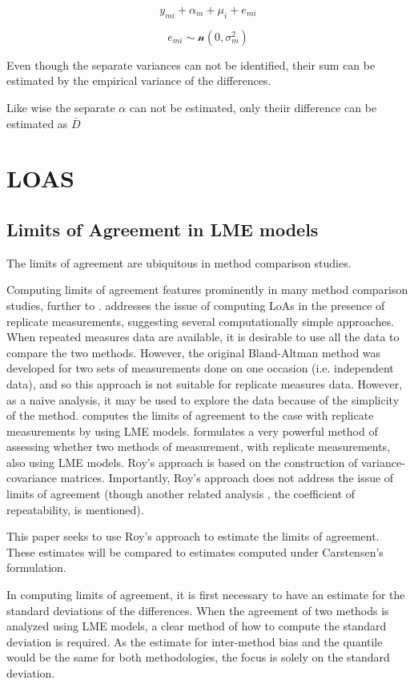 \documentclass[12pt, a4paper]{report}
\theoremstyle{plain}
\theoremstyle{definition}
\theoremstyle{remark}
\begin{document}
\[y_{mi} + \alpha_{m} + \mu_{i} + e_{mi}\]

\[e_{mi} \sim \mathcal{n} (0,\sigma^2_m)\]

Even though the separate variances can not be
identified, their sum can be estimated by the empirical variance of the differences.

Like wise the separate $\alpha$ can not be
estimated, only theiir difference can be estimated as
$\bar{D}$


\chapter{LOAS}
\section{Limits of Agreement in LME models}
The limits of agreement \citep{BA86} are ubiquitous in method comparison studies. 

Computing limits of agreement features prominently in many method comparison studies, further to \citet{BA86,BA99}.
\citet{BA99} addresses the issue of computing LoAs in the presence of replicate measurements, suggesting several computationally simple approaches. When repeated measures data are available, it is desirable to use
all the data to compare the two methods. However, the original Bland-Altman method was developed for two sets of measurements done on one occasion (i.e. independent data), and so this approach is not suitable for replicate measures data. However, as a naive analysis, it may be used to explore the data because of the simplicity of the method.
\citet{BXC2008}  computes the limits of agreement to the case with replicate measurements by using LME models.
\bigskip
\citet{ARoy2009} formulates a very powerful method of assessing whether two methods of measurement, with replicate measurements, also using LME models. Roy's approach is based on the construction of variance-covariance matrices.
Importantly, Roy's approach does not address the issue of limits of agreement (though another related analysis , the coefficient of repeatability, is mentioned).

This paper seeks to use Roy's approach to estimate the limits of agreement. These estimates will be compared to estimates computed under Carstensen's formulation.

In computing limits of agreement, it is first necessary to have an estimate for the standard deviations of the differences. When the agreement of two methods is analyzed using LME models, a clear method of how to compute the standard deviation is required. As the estimate for inter-method bias and the quantile would be the same for both methodologies, the focus is solely on the standard deviation.
\end{document}
